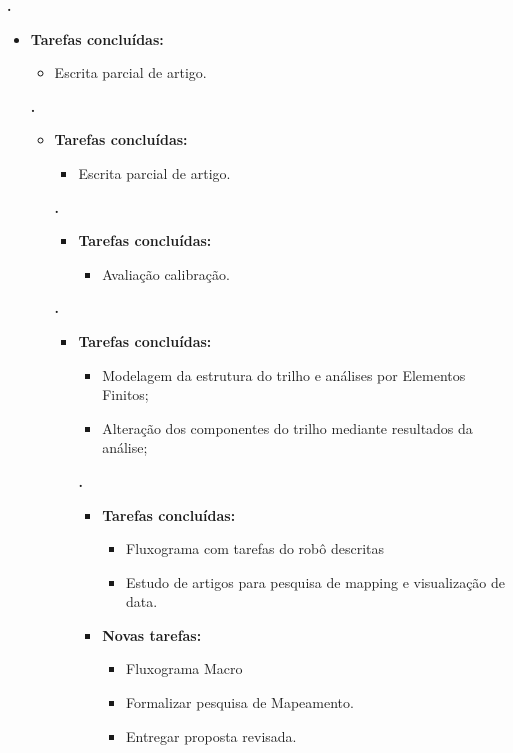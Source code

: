   
\textbf{\renan.} 
	\begin{itemize}
		\item \textbf{Tarefas concluídas:}
			\begin{itemize}    
				\item Escrita parcial de artigo.
			\end{itemize}

		
\textbf{\elael.} 
	\begin{itemize}
		\item \textbf{Tarefas concluídas:}
			\begin{itemize}    
				\item Escrita parcial de artigo.
			\end{itemize}
		
			
   \textbf{\gabriel.} 
	\begin{itemize}
		\item \textbf{Tarefas concluídas:}
			\begin{itemize}    
				\item Avaliação calibração.
			\end{itemize}
		
	\end{itemize}

			
\textbf{.} 
	\begin{itemize}
		\item \textbf{Tarefas concluídas:}
			\begin{itemize}    
				\item Modelagem da estrutura do trilho e análises por Elementos Finitos;
				\item Alteração dos componentes do trilho mediante resultados da análise;										
			\end{itemize}
												
	
		
   \textbf{\julia.} 
	\begin{itemize}
		\item \textbf{Tarefas concluídas:}
			\begin{itemize}    
				\item Fluxograma com tarefas do robô descritas
			    \item Estudo de artigos para pesquisa de mapping e visualização de data.
			\end{itemize}
		
		\item \textbf{Novas tarefas:}
			\begin{itemize} 
			 \item Fluxograma Macro
			 \item Formalizar pesquisa de Mapeamento.
			 \item Entregar proposta revisada.
			\end{itemize}
	\end{itemize}


\end{itemize}
\end{itemize}
\end{itemize}
